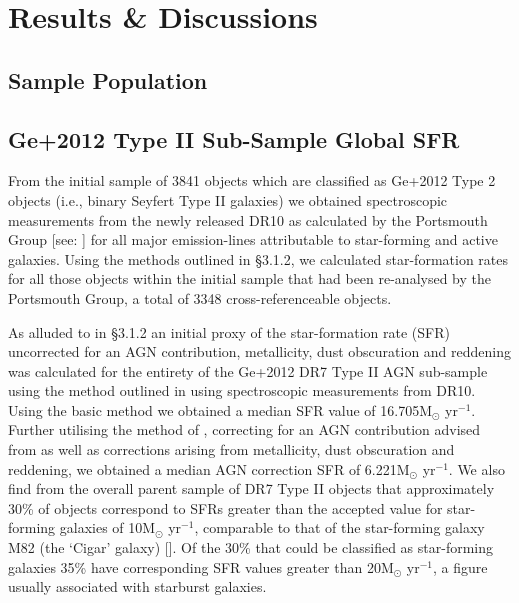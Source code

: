 \section{Results \& Discussions}
\subsection{Sample Population}
\subsection{Ge+2012 Type II Sub-Sample Global SFR}

From the initial sample of 3841 objects which are classified as Ge+2012 Type 2 objects (i.e., binary Seyfert Type II galaxies) we obtained spectroscopic measurements from the newly released DR10 as calculated by the Portsmouth Group [see: \cite{Thomas_2013}] for all major emission-lines attributable to star-forming and active galaxies. Using the methods outlined in §3.1.2, we calculated star-formation rates for all those objects within the initial sample that had been re-analysed by the Portsmouth Group, a total of 3348 cross-referenceable objects.       

As alluded to in §3.1.2 an initial proxy of the star-formation rate (SFR) uncorrected for an AGN contribution, metallicity, dust obscuration and reddening was calculated for the entirety of the Ge+2012 DR7 Type II AGN sub-sample using the method outlined in \cite{Kennicutt_1998} using spectroscopic measurements from DR10. Using the basic \cite{Kennicutt_1998} method we obtained a median SFR value of 16.705M$_{\odot}$ yr$^{-1}$. Further utilising the method of \cite{Kewley_2004}, correcting for an AGN contribution advised from \cite{2006ApJ...642..702K} as well as corrections arising from metallicity, dust obscuration and reddening, we obtained a median AGN correction SFR of 6.221M$_{\odot}$ yr$^{-1}$. We also find from the overall parent sample of DR7 Type II objects that approximately 30\% of objects correspond to SFRs greater than the accepted value for star-forming galaxies of 10M$_{\odot}$ yr$^{-1}$, comparable to that of the star-forming galaxy M82 (the ‘Cigar’ galaxy) [\cite{2009ApJ...706.1364F}]. Of the 30\% that could be classified as star-forming galaxies 35\% have corresponding SFR values greater than 20M$_{\odot}$ yr$^{-1}$, a figure usually associated with starburst galaxies.


